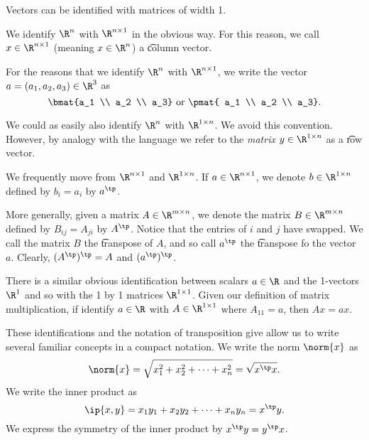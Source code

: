 
Vectors can be identified with matrices of width 1.

We identify $\R^{n}$ with $\R^{n \times 1}$ in the obvious way.
For this reason, we call $x \in \R^{n \times 1}$ (meaning $x \in \R^{n}$) a \t{column vector}.

For the reasons that we identify $\R^n$ with $\R^{n \times 1}$, we write the vector $a = (a_1, a_2, a_3) \in \R^3$ as
  \[
\bmat{a_1 \\ a_2 \\ a_3}
\text{ or }
\pmat{ a_1 \\ a_2 \\ a_3}.
  \]

We could as easily also identify $\R^{n}$ with $\R^{1 \times n}$.
We avoid this convention.
However, by analogy with the language  we refer to the \textit{matrix} $y \in \R^{1 \times n}$ as a \t{row vector}.

We frequently move from $\R^{n \times 1}$ and $\R^{1 \times n}$.
If $a \in \R^{n \times 1}$, we denote $b \in \R^{1 \times n}$ defined by $b_i = a_i$ by $a^\tp$.

More generally, given a matrix $A \in \R^{m \times n}$, we denote the matrix $B \in \R^{m \times n}$ defined by $B_{ij} = A_{ji}$ by $A^\tp$.
Notice that the entries of $i$ and $j$ have swapped.
We call the matrix $B$ the \t{transpose} of $A$, and so call $a^\tp$ the \t{transpose} fo the vector $a$.
Clearly, $(A^\tp)^\tp = A$ and $(a^\tp)^\tp$.

There is a similar obvious identification between scalars $a \in \R$ and the 1-vectors $\R^{1}$ and so with the 1 by 1 matrices $\R^{1 \times 1}$.
Given our definition of matrix multiplication, if identify $a \in \R$ with $A \in \R^{1 \times 1}$ where $A_{11} = a$, then $Ax = ax$.

These identifications and the notation of transposition give allow us to write several familiar concepts in a compact notation.
We write the norm $\norm{x}$ as
  \[
\norm{x} = \sqrt{x_1^2 + x_2^2 + \cdots + x_n^2} = \sqrt{x^\tp x}.
  \]
We write the inner product as
  \[
\ip{x,y} =
x_1y_1 + x_2y_2 + \cdots + x_ny_n
= x^\tp y.
  \]
We express the symmetry of the inner product by $ x^\tp y = y^\tp x$.

\blankpage
